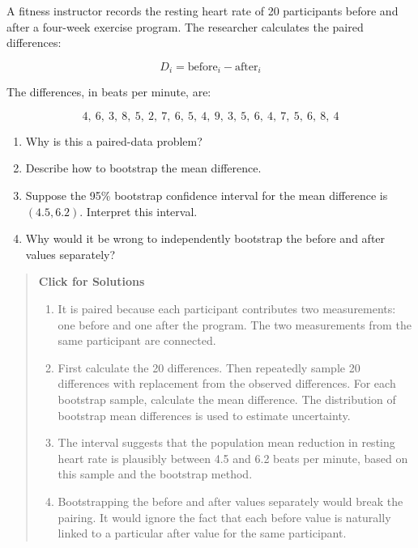 \documentclass[
  letterpaper,
  DIV=11,
  numbers=noendperiod]{scrreprt}
\begin{document}
\begin{tcolorbox}[enhanced jigsaw, arc=.35mm, bottomrule=.15mm, bottomtitle=1mm, breakable, colback=white, colbacktitle=quarto-callout-note-color!10!white, colframe=quarto-callout-note-color-frame, coltitle=black, left=2mm, leftrule=.75mm, opacityback=0, opacitybacktitle=0.6, rightrule=.15mm, title=\textcolor{quarto-callout-note-color}{\faInfo}\hspace{0.5em}{Question 4}, titlerule=0mm, toprule=.15mm, toptitle=1mm]

A fitness instructor records the resting heart rate of 20 participants
before and after a four-week exercise program. The researcher calculates
the paired differences:

\[D_i = \text{before}_i - \text{after}_i\]

The differences, in beats per minute, are:

\[4,\ 6,\ 3,\ 8,\ 5,\ 2,\ 7,\ 6,\ 5,\ 4,\ 9,\ 3,\ 5,\ 6,\ 4,\ 7,\ 5,\ 6,\ 8,\ 4\]

\begin{enumerate}
\def\labelenumi{(\alph{enumi})}
\item
  Why is this a paired-data problem?
\item
  Describe how to bootstrap the mean difference.
\item
  Suppose the 95\% bootstrap confidence interval for the mean difference
  is \((4.5, 6.2)\). Interpret this interval.
\item
  Why would it be wrong to independently bootstrap the before and after
  values separately?
\end{enumerate}

\begin{quote}
\textbf{Click for Solutions}

\begin{enumerate}
\def\labelenumi{(\alph{enumi})}
\item
  It is paired because each participant contributes two measurements:
  one before and one after the program. The two measurements from the
  same participant are connected.
\item
  First calculate the 20 differences. Then repeatedly sample 20
  differences with replacement from the observed differences. For each
  bootstrap sample, calculate the mean difference. The distribution of
  bootstrap mean differences is used to estimate uncertainty.
\item
  The interval suggests that the population mean reduction in resting
  heart rate is plausibly between 4.5 and 6.2 beats per minute, based on
  this sample and the bootstrap method.
\item
  Bootstrapping the before and after values separately would break the
  pairing. It would ignore the fact that each before value is naturally
  linked to a particular after value for the same participant.
\end{enumerate}
\end{quote}

\end{tcolorbox}
\end{document}
